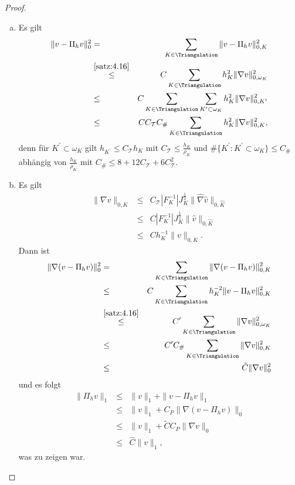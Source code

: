 \begin{proof}
    \begin{enumerate}[a)]
      \item
        Es gilt
        \begin{eqnarray*}
                \|v - \Pi_h v\|_0^2
            &=& \sum_{K\in \Triangulation} \|v - \Pi_h v\|_{0,K}^2 \\
            &\stackrel{\eqref{satz:4.16}}{\le}&
                  C \sum_{K\in \Triangulation} h_K^2 \|\nabla v\|_{0,\omega_K}^2
                  \\
            &\le& C \sum_{K\in \Triangulation} \sum_{K^\prime \subset \omega_K}
                  h_K^2 \|\nabla v\|_{0,K^\prime}^2 \\
            &\le& C C_\mathcal{T} C_\# \sum_{K\in \Triangulation} h_K^2
                  \|\nabla v\|_{0, K}^2,
        \end{eqnarray*}
        denn für $K^\prime \subset \omega_K$ gilt $h_{K^\prime} \le
        C_\mathcal{T} h_K$ mit $C_\mathcal{T} \le \frac{h_K}{\rho_K}$ und
        $\#\{K^\prime: K^\prime \subset \omega_K\} \le C_\#$ abhängig von
        $\frac{h_K}{\rho_K}$ mit $C_\# \le 8 + 12 C_\mathcal{T} +
        6 C_\mathcal{T}^2$.
      \item
        Es gilt
        \begin{eqnarray*}
                  \|\nabla v\|_{0,K}
            &\le& C_\mathcal{T} |F_K^{-1}| J_K^\frac{1}{2}
                  \|\hat\nabla \hat v\|_{0,\hat K} \\
            &\le& C |F_K^{-1}| J_K^\frac{1}{2} \|\hat v\|_{0,\hat K} \\
            &\le& C h_K^{-1} \|v\|_{0,K}.
        \end{eqnarray*}
        Dann ist
        \begin{eqnarray*}
                \|\nabla (v - \Pi_h v)\|_0^2
            &=& \sum_{K\in \Triangulation} \|\nabla (v - \Pi_h v) \|_{0,K}^2 \\
            &\le& C \sum_{K\in \Triangulation} h_K^{-2} \|v - \Pi_h v\|_{0,K}^2
                  \\
            &\stackrel{\eqref{satz:4.16}}{\le}&
                  C^\prime \sum_{K\in \Triangulation}
                  \|\nabla v\|_{0,\omega_K}^2 \\
            &\le& C^\prime C_\# \sum_{K\in \Triangulation} \|\nabla v\|_{0,K}^2\\
            &\le& \tilde C \|\nabla v\|_0^2
        \end{eqnarray*}
        und es folgt
        \begin{eqnarray*}
                  \|\Pi_h v\|_1
            &\le& \|v\|_1 + \|v - \Pi_h v\|_1 \\
            &\le& \|v\|_1 + C_P \|\nabla (v - \Pi_h v)\|_0 \\
            &\le& \|v\|_1 + \tilde C C_P \|\nabla v\|_0 \\
            &\le& \hat C \|v\|_1,
        \end{eqnarray*}
        was zu zeigen war.
    \end{enumerate}
\end{proof}


